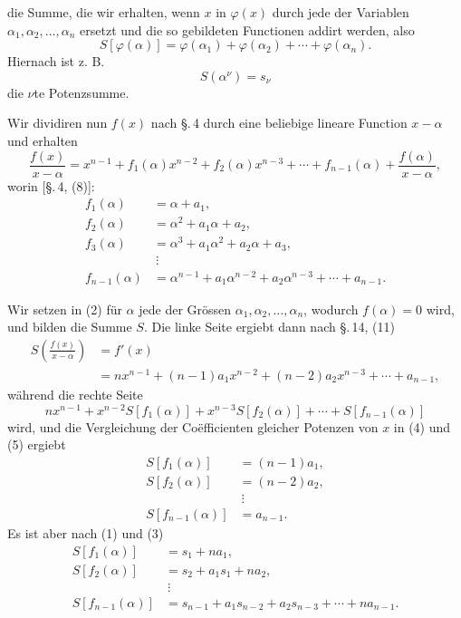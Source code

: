 
die Summe, die wir erhalten, wenn $x$ in $\varphi(x)$ durch jede der Variablen $\alpha_1,\alpha_2,\ldots,\alpha_n$ ersetzt und die so gebildeten Functionen addirt werden, also
\[
 S[\varphi(\alpha)]=\varphi(\alpha_1)+\varphi(\alpha_2)+\cdots+\varphi(\alpha_n).
\]
Hiernach ist z. B.
\[
 S(\alpha^\nu)=s_\nu
\]
die $\nu$te Potenzsumme.

Wir dividiren nun $f(x)$ nach \S.\,4 durch eine beliebige lineare Function $x-\alpha$ und erhalten
\begin{equation}
 \frac{f(x)}{x-\alpha}
   =x^{n-1}+f_1(\alpha)x^{n-2}+f_2(\alpha)x^{n-3}+\cdots+f_{n-1}(\alpha)+\frac{f(\alpha)}{x-\alpha},
\tag{2}
\end{equation}
worin [\S.\,4, (8)]:
\begin{equation}
\begin{aligned}
 f_1(\alpha)&=\alpha+a_1,\\
 f_2(\alpha)&=\alpha^2+a_1\alpha+a_2,\\
 f_3(\alpha)&=\alpha^3+a_1\alpha^2+a_2\alpha+a_3,\\
 &\ \vdots\\
 f_{n-1}(\alpha)&=\alpha^{n-1}+a_1\alpha^{n-2}+a_2\alpha^{n-3}+\cdots+a_{n-1}.
\end{aligned}
\tag{3}
\end{equation}

Wir setzen in (2) für $\alpha$ jede der Grössen $\alpha_1,\alpha_2,\ldots,\alpha_n$, wodurch $f(\alpha)=0$ wird, und bilden die Summe $S$. Die linke Seite ergiebt dann nach \S.\,14, (11)
\begin{equation}
\begin{aligned}
 S\left(\frac{f(x)}{x-\alpha}\right)&=f'(x)\\
 &=n x^{n-1}+(n-1)a_1x^{n-2}+(n-2)a_2x^{n-3}+\cdots+a_{n-1},
\end{aligned}
\tag{4}
\end{equation}
während die rechte Seite
\begin{equation}
 n x^{n-1}+x^{n-2}S[f_1(\alpha)]+x^{n-3}S[f_2(\alpha)]+\cdots+S[f_{n-1}(\alpha)]
\tag{5}
\end{equation}
wird, und die Vergleichung der Coëfficienten gleicher Potenzen von $x$ in (4) und (5) ergiebt
\begin{equation}
\begin{aligned}
 S[f_1(\alpha)]&=(n-1)a_1,\\
 S[f_2(\alpha)]&=(n-2)a_2,\\
 &\ \vdots\\
 S[f_{n-1}(\alpha)]&=a_{n-1}.
\end{aligned}
\tag{6}
\end{equation}
Es ist aber nach (1) und (3)
\[
\begin{aligned}
 S[f_1(\alpha)]&=s_1+na_1,\\
 S[f_2(\alpha)]&=s_2+a_1s_1+na_2,\\
 &\ \vdots\\
 S[f_{n-1}(\alpha)]&=s_{n-1}+a_1s_{n-2}+a_2s_{n-3}+\cdots+na_{n-1}.
\end{aligned}
\]
